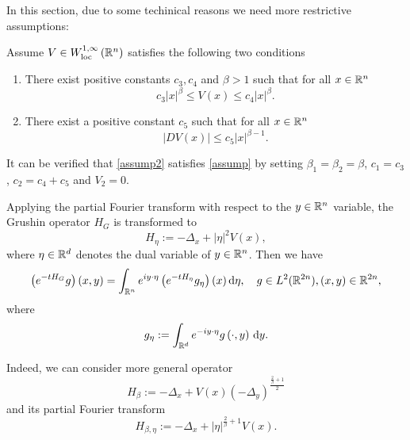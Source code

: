 In this section, due to some techinical reasons we need more restrictive assumptions:

\begin{assumption}\label{assump2}
	Assume $V \in W^{1,\infty}_{\mathrm{loc}}\left( \mathbb{R}^{n} \right) $ satisfies the following two conditions
	\begin{enumerate}
		\item There exist positive constants $c_3,c_4$ and $\beta>1 $ such that for all $x\in \mathbb{R}^{n}$
			\begin{equation}
				c_3|x|^{\beta }\le V(x)\le c_4|x|^{\beta }. 
			\end{equation}
		\item There exist a positive constant $c_5$ such that for all $x\in \mathbb{R}^{n}$ 
			\begin{equation}
				|DV(x)|\le c_5 |x|^{\beta -1}.
			\end{equation}
	\end{enumerate}
\end{assumption}
It can be verified that \cref{assump2} satisfies \cref{assump} by setting $\beta _1=\beta _2=\beta $, $c_1=c_3$,  $c_2=c_4+c_5$ and  $V_2=0$.


Applying the partial Fourier transform with respect to the $y\in \mathbb{R}^{n}$ variable, the Grushin operator $H_G$ is transformed to 
\begin{equation}
	H_{\eta}:=-\Delta_x+|\eta|^2V(x),
\end{equation}
where $\eta \in \mathbb{R}^{d}$ denotes the dual variable of $y\in \mathbb{R}^{n}$. Then we have
\begin{equation}
	\left( e^{-tH_G} g\right)(x,y)=\int_{\mathbb{R}^{n}}e^{i y\cdot \eta }\left( e^{-t H_\eta }g_\eta  \right) (x)\,\mathrm{d} \eta,\quad g\in L^2(\mathbb{R}^{2n}), (x,y) \in \mathbb{R}^{2n},
\end{equation}
where
\[
g_{\eta }:=\int_{\mathbb{R}^{d}}e^{-iy\cdot \eta }g\left( \cdot ,y \right) \,\mathrm{d} y.
\]

Indeed, we can consider more general operator
\begin{equation}
	{H}_{\beta}:=- \Delta_x + V(x)\left( -\Delta_y \right)^{\frac{\frac{2}{\beta}+1}{2}} 
\end{equation}
and its partial Fourier transform
\begin{equation}
	{H}_{\beta ,\eta} :=-\Delta_x+|\eta |^{\frac{2}{\beta}+1 } V(x).
\end{equation}

